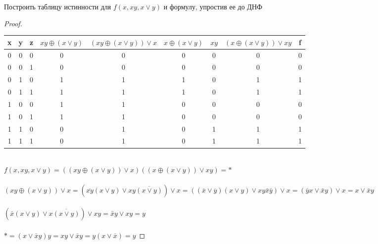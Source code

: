 \begin{problem}
Построить таблицу истинности для $f(x, xy, x \vee y)$ и формулу, упростив ее до ДНФ
\end{problem}
\begin{proof} $ $\\
    \begin{table}[H]
    \begin{center}
    \begin{tabular}{|c|c|c|c|c|c|c|c|c|}
    \hline
    x & y & z & $xy \oplus (x \vee y)$ & $(xy \oplus (x \vee y)) \vee x$ & $x \oplus (x \vee y)$ & $xy$ & $(x \oplus (x \vee y)) \vee xy$ & f \\
    \hline
    0 & 0 & 0   & 0 & 0 & 0 & 0 & 0 & 0\\
    0 & 0 & 1   & 0 & 0 & 0 & 0 & 0 & 0\\
    0 & 1 & 0   & 1 & 1 & 1 & 0 & 1 & 1\\
    0 & 1 & 1   & 1 & 1 & 1 & 0 & 1 & 1\\
    1 & 0 & 0   & 1 & 1 & 0 & 0 & 0 & 0\\
    1 & 0 & 1   & 1 & 1 & 0 & 0 & 0 & 0\\
    1 & 1 & 0   & 0 & 1 & 0 & 1 & 1 & 1\\
    1 & 1 & 1   & 0 & 1 & 0 & 1 & 1 & 1\\
    \hline
    \end{tabular}
    \end{center}
    \end{table}
    $ $\\
    $f(x, xy, x \vee y) = ((xy \oplus (x \vee y)) \vee x)((x \oplus (x \vee y)) \vee xy) = *$\\\\
    $(xy \oplus (x \vee y)) \vee x = (\overline{xy}(x \vee y) \vee xy\overline{(x \vee y)}) \vee x = ((\overline{x} \vee \overline{y})(x \vee y) \vee xy\bar{x}\bar{y})\vee x = (\bar{y}x \vee \bar{x}y) \vee x = x \vee \bar{x}y $\\\\
    $(\bar{x}(x \vee y) \vee x\overline{(x \vee y)}) \vee xy = \bar{x}y \vee xy = y$\\\\
    $* = (x \vee \bar{x}y)y = xy \vee \bar{x}y = y(x \vee \bar{x}) = y$
\end{proof}

